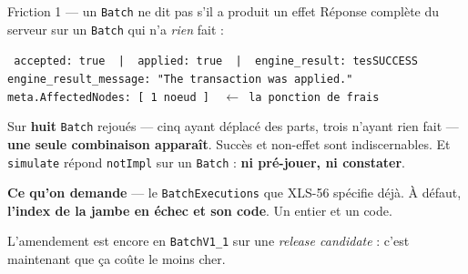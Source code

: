 \documentclass[aspectratio=169,11pt]{beamer}
\newcommand{\tc}[1]{{\small\texttt{#1}}}
\begin{document}
\begin{frame}{Friction 1 --- un \texttt{Batch} ne dit pas s'il a produit un effet}
\vspace{4pt}
{\small\color{ink2}Réponse complète du serveur sur un \tc{Batch} qui n'a \emph{rien} fait :}
\vspace{3pt}

\colorbox{shade}{\parbox{\textwidth}{\vspace{3pt}\small\texttt{
accepted: true~~|~~applied: true~~|~~engine\_result: tesSUCCESS\\
engine\_result\_message: "The transaction was applied."\\
meta.AffectedNodes: [ 1 noeud ]~~$\leftarrow$ la ponction de frais}\vspace{3pt}}}
\vspace{8pt}

Sur \textbf{huit} \tc{Batch} rejoués --- cinq ayant déplacé des parts, trois n'ayant rien
fait --- \textbf{une seule combinaison apparaît}. Succès et non-effet sont indiscernables.
Et \tc{simulate} répond \tc{notImpl} sur un \tc{Batch} : \textbf{ni pré-jouer, ni constater}.
\vspace{8pt}

{\color{accent}\textbf{Ce qu'on demande}} --- le \tc{BatchExecutions} que XLS-56 spécifie déjà.
À défaut, \textbf{l'index de la jambe en échec et son code}. Un entier et un code.
\vspace{4pt}

{\small\color{ink2}L'amendement est encore en \tc{BatchV1\_1} sur une \emph{release candidate} :
c'est maintenant que ça coûte le moins cher.}
\end{frame}
\end{document}
